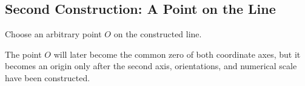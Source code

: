 \subsection{Second Construction: A Point on the Line}

\begin{derivationbox}
Choose an arbitrary point $O$ on the constructed line.
\end{derivationbox}

\begin{corebox}
The point $O$ will later become the common zero of both coordinate axes, but it
becomes an origin only after the second axis, orientations, and numerical scale
have been constructed.
\end{corebox}

\begin{center}
\end{center}
